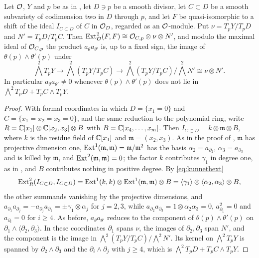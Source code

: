 \begin{lemma}\label{lem:divisorgerm}
Let $\mathcal{O}$, $Y$ and $p$ be as in , let $D\ni p$ be a
smooth divisor, let $C\subset D$ be a smooth subvariety of codimension two in
$D$ through $p$, and let $F$ be quasi-isomorphic to a shift of the ideal
$I_{C\subset D}$ of $C$ in $\mathcal{O}_{D}$, regarded as an $\mathcal{O}$-module. Put
$\nu=T_{p}Y/T_{p}D$ and $N'=T_{p}D/T_{p}C$. Then
$\operatorname{Ext}^{2}_{\mathcal{O}}(F,F)\cong\mathcal{O}_{C,p}\otimes\nu\otimes N'$, and modulo the maximal
ideal of $\mathcal{O}_{C,p}$ the product $a_{\theta}a_{\theta'}$ is, up to a fixed
sign, the image of $\theta(p)\wedge\theta'(p)$ under
\[
  \textstyle\bigwedge^{2}T_{p}Y\longrightarrow\bigwedge^{2}(T_{p}Y/T_{p}C)
  \longrightarrow\bigwedge^{2}(T_{p}Y/T_{p}C)\big/\bigwedge^{2}N'\cong\nu\otimes N'.
\]
In particular $a_{\theta}a_{\theta'}\ne0$ whenever $\theta(p)\wedge\theta'(p)$
does not lie in $\bigwedge^{2}T_{p}D+T_{p}C\wedge T_{p}Y$.
\end{lemma}

\begin{proof}
With formal coordinates in which $D=\{x_{1}=0\}$ and $C=\{x_{1}=x_{2}=x_{3}=0\}$,
and the same reduction to the polynomial ring, write
$R=\mathbb{C}[x_{1}]\otimes\mathbb{C}[x_{2},x_{3}]\otimes B$ with $B=\mathbb{C}[x_{4},\dots,x_{m}]$.
Then $I_{C\subset D}=k\otimes\mathfrak m\otimes B$, where $k$ is the residue
field of $\mathbb{C}[x_{1}]$ and $\mathfrak m=(x_{2},x_{3})$. As in the proof of
, $\mathfrak m$ has projective dimension one,
$\operatorname{Ext}^{1}(\mathfrak m,\mathfrak m)=\mathfrak m/\mathfrak m^{2}$ has the basis
$\alpha_{2}=a_{\partial_{2}}$, $\alpha_{3}=a_{\partial_{3}}$ and is killed by
$\mathfrak m$, and $\operatorname{Ext}^{2}(\mathfrak m,\mathfrak m)=0$; the factor $k$
contributes $\gamma_{1}$ in degree one, as in , and $B$
contributes nothing in positive degree. By \eqref{eq:kunnethext}
\[
  \operatorname{Ext}^{2}_{R}(I_{C\subset D},I_{C\subset D})
  =\operatorname{Ext}^{1}(k,k)\otimes\operatorname{Ext}^{1}(\mathfrak m,\mathfrak m)\otimes B
  =\langle\gamma_{1}\rangle\otimes\langle\alpha_{2},\alpha_{3}\rangle\otimes B,
\]
the other summands vanishing by the projective dimensions, and
$a_{\partial_{1}}a_{\partial_{j}}=-a_{\partial_{j}}a_{\partial_{1}}=\pm\gamma_{1}\otimes\alpha_{j}$
for $j=2,3$, while $a_{\partial_{2}}a_{\partial_{3}}=1\otimes\alpha_{2}\alpha_{3}=0$,
$a_{\partial_{1}}^{2}=0$ and $a_{\partial_{i}}=0$ for $i\ge4$. As before,
$a_{\theta}a_{\theta'}$ reduces to the component of $\theta(p)\wedge\theta'(p)$
on $\partial_{1}\wedge\langle\partial_{2},\partial_{3}\rangle$. In these
coordinates $\partial_{1}$ spans $\nu$, the images of $\partial_{2},\partial_{3}$
span $N'$, and the component is the image in
$\bigwedge^{2}(T_{p}Y/T_{p}C)/\bigwedge^{2}N'$. Its kernel on
$\bigwedge^{2}T_{p}Y$ is spanned by $\partial_{2}\wedge\partial_{3}$ and the
$\partial_{i}\wedge\partial_{j}$ with $j\ge4$, which is
$\bigwedge^{2}T_{p}D+T_{p}C\wedge T_{p}Y$.
\end{proof}

